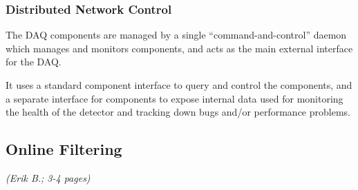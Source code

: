 \subsubsection{Distributed Network Control}


The DAQ components are managed by a single ``command-and-control'' daemon
which manages and monitors components, and acts as the main
external interface for the DAQ.

It uses a standard component interface to query and
control the components, and a separate interface for components to expose
internal data used for monitoring the health of the detector and tracking
down bugs and/or performance problems.




\subsection{Online Filtering}
\textsl{(Erik B.; 3-4 pages)}
